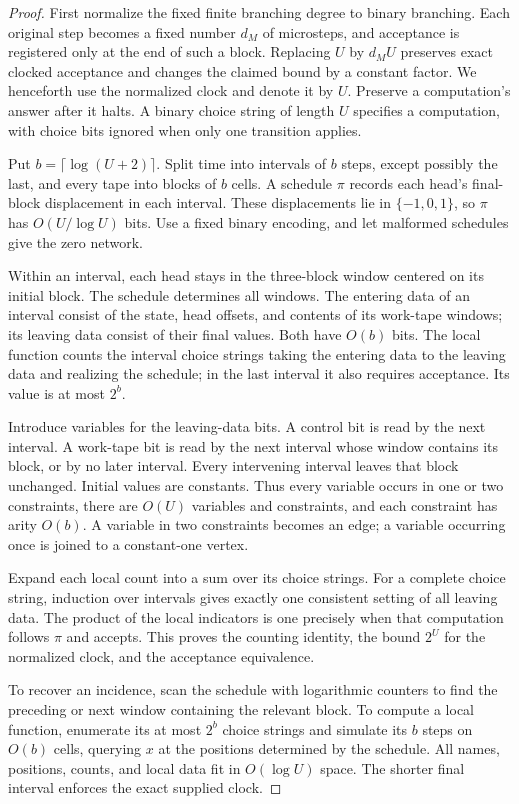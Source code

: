 \documentclass[11pt]{article}
\theoremstyle{definition}
\theoremstyle{remark}
\begin{document}
\begin{proof}
First normalize the fixed finite branching degree to binary branching. Each original step becomes a fixed number $d_M$ of microsteps, and acceptance is registered only at the end of such a block. Replacing $U$ by $d_MU$ preserves exact clocked acceptance and changes the claimed bound by a constant factor. We henceforth use the normalized clock and denote it by $U$. Preserve a computation's answer after it halts. A binary choice string of length $U$ specifies a computation, with choice bits ignored when only one transition applies.

Put $b=\lceil\log(U+2)\rceil$. Split time into intervals of $b$ steps, except possibly the last, and every tape into blocks of $b$ cells. A schedule $\pi$ records each head's final-block displacement in each interval. These displacements lie in $\{-1,0,1\}$, so $\pi$ has $O(U/\log U)$ bits. Use a fixed binary encoding, and let malformed schedules give the zero network.

Within an interval, each head stays in the three-block window centered on its initial block. The schedule determines all windows. The entering data of an interval consist of the state, head offsets, and contents of its work-tape windows; its leaving data consist of their final values. Both have $O(b)$ bits. The local function counts the interval choice strings taking the entering data to the leaving data and realizing the schedule; in the last interval it also requires acceptance. Its value is at most $2^b$.

Introduce variables for the leaving-data bits. A control bit is read by the next interval. A work-tape bit is read by the next interval whose window contains its block, or by no later interval. Every intervening interval leaves that block unchanged. Initial values are constants. Thus every variable occurs in one or two constraints, there are $O(U)$ variables and constraints, and each constraint has arity $O(b)$. A variable in two constraints becomes an edge; a variable occurring once is joined to a constant-one vertex.

Expand each local count into a sum over its choice strings. For a complete choice string, induction over intervals gives exactly one consistent setting of all leaving data. The product of the local indicators is one precisely when that computation follows $\pi$ and accepts. This proves the counting identity, the bound $2^U$ for the normalized clock, and the acceptance equivalence.

To recover an incidence, scan the schedule with logarithmic counters to find the preceding or next window containing the relevant block. To compute a local function, enumerate its at most $2^b$ choice strings and simulate its $b$ steps on $O(b)$ cells, querying $x$ at the positions determined by the schedule. All names, positions, counts, and local data fit in $O(\log U)$ space. The shorter final interval enforces the exact supplied clock.
\end{proof}
\end{document}
